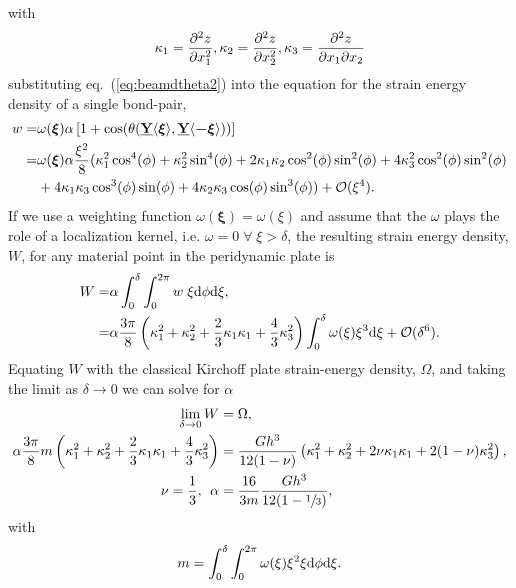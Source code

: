 \documentclass[preprint,review,12pt]{elsarticle}
\newcommand\vstate[3]{%
	\mathbf{\underline{#1}}%
	\ifstrempty{#2}{}{[#2]}%
	\ifstrempty{#3}{}{\langle #3 \rangle}}
\begin{document}
%
with
%
\begin{equation}
    \kappa_1=\frac{\partial^2 z}{\partial x_1^2}, \kappa_2= \frac{\partial^2 z}{\partial x_2^2}, \kappa_3=\frac{\partial^2 z}{\partial x_1\partial x_2}\notag
\end{equation}
%
substituting eq.~(\ref{eq:beamdtheta2}) into the equation for the strain energy density of a single bond-pair,
%
\begin{align}
    w =& \omega(\boldsymbol{\xi}) \alpha \left[1+\cos(\theta(\vstate{Y}{}{\boldsymbol{\xi}},\vstate{Y}{}{\boldsymbol{-\xi}}) ) \right] \notag \\
    =& \omega(\boldsymbol{\xi}) \alpha\frac{\xi^2}{8}(\kappa_1^2\cos^4(\phi)+\kappa_2^2\sin^4(\phi)+2\kappa_1\kappa_2\cos^2(\phi)\sin^2(\phi)+4\kappa_3^2\cos^2(\phi)\sin^2(\phi) \notag \\
    & +4\kappa_1\kappa_3\cos^3(\phi)\sin(\phi)+4\kappa_2\kappa_3\cos(\phi)\sin^3(\phi))+\mathcal{O}(\xi^4).\notag
\end{align}
%
If we use a weighting function \(\omega(\boldsymbol{\xi})=\omega(\xi)\) and assume that the $\omega$ plays the role of a localization kernel, i.e. $\omega = 0 \; \forall \; \xi > \delta$, the resulting strain energy density, $W$, for any material point in the peridynamic plate is
%
\begin{align}
    W =& \alpha \int_{0}^\delta\int_0^{2 \pi} w\; \xi {\rm d}\phi {\rm d}\xi ,\notag \\
    =& \alpha \frac{3\pi}{8} \left(\kappa_1^2+\kappa_2^2+\frac{2}{3}\kappa_1\kappa_1+\frac{4}{3}\kappa_3^2 \right)\int_{0}^\delta \omega(\xi)\xi^3{\rm d}\xi + \mathcal{O}(\delta^6).\notag 
\end{align}
%
Equating $W$ with the classical Kirchoff plate strain-energy density, $\Omega$, and taking the limit as $\delta \to 0$ we can solve for $\alpha$
%
\begin{align}
    \lim_{\delta \to 0}  W &= \Omega, \notag \\
    \alpha \frac{3 \pi}{8} m \left(\kappa_1^2+\kappa_2^2+\frac{2}{3}\kappa_1\kappa_1+\frac{4}{3}\kappa_3^2 \right)&= \frac{G h^3}{12(1-\nu)} \left(\kappa_1^2+\kappa_2^2+2\nu\kappa_1\kappa_1+2(1-\nu)\kappa_3^2 \right), \notag \\
    \nu = \frac{1}{3},\:\: \alpha &= \frac{16}{3 m} \frac{G h^3}{12(1-\sfrac{1}{3})},
\label{eq:alpha}
\end{align}
%
with 
\begin{equation}
    m = \int_{0}^{\delta} \int_{0}^{2\pi}\omega(\xi) \xi^2 \xi {\rm d}\phi {\rm d}\xi \notag.
\end{equation}
\end{document}
